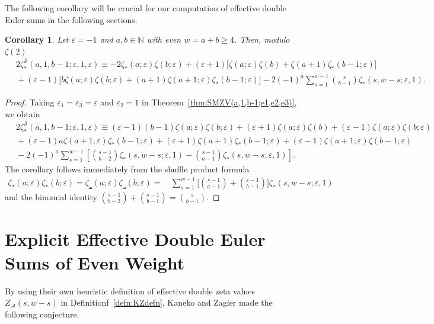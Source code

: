 \documentclass{article}
\newcommand{\sha}{\shuffle}
\newcommand{\Sy}{{\mathcal S}}
\newcommand\eps{{\varepsilon}}
\newcommand{\calA}{\mathcal{A}}
\newcommand{\N}{\mathbb{N}}
\theoremstyle{plain}
\newtheorem{cor}[thm]{Corollary}
\theoremstyle{definition}
\begin{document}
The following corollary will be crucial for our computation of effective double Euler sums in the following sections.
\begin{cor}\label{cor:SMZV(a,1,b-1;eps,1,eps)}
Let $\eps=-1$ and $a,b\in\N$ with even $w=a+b\ge 4$. Then, modulo $\zeta(2)$
\begin{align*}
&\, 2\zeta_\ast^\Sy(a,1,b-1; \eps,1,\eps)
\equiv-2\zeta_*(a;\eps)\zeta(b;\eps)
+(\eps+1)\Big[\zeta(a;\eps)\zeta(b)
+\zeta(a+1)\zeta_*(b-1;\eps) \Big]\\
&\,+(\eps-1)\Big[
b\zeta(a;\eps)\zeta(b; \eps) +(a+1)\zeta(a+1; \eps)\zeta_*(b-1;\eps) \Big]
 -2(-1)^{a}\sum_{s=1}^{w-1}\binom{s}{b-1}\zeta_*(s,w-s;\eps,1) .
\end{align*}
\end{cor}

\begin{proof}
Taking $\eps_1=\eps_3=\eps$ and $\eps_2=1$ in Theorem~\ref{thm:SMZV(a,1,b-1;e1,e2,e3)}, we obtain
\begin{align*}
&\, 2\zeta_\ast^\Sy(a,1,b-1;\eps,1,\eps)
\equiv(\eps-1) (b-1)\zeta(a;\eps)\zeta(b; \eps)
+(\eps+1)\zeta(a;\eps)\zeta(b)
+(\eps-1)\zeta(a;\eps)\zeta(b;\eps)\\
&\,+(\eps-1)a\zeta(a+1; \eps)\zeta_*(b-1;\eps)
+(\eps+1)\zeta(a+1)\zeta_*(b-1;\eps)
+(\eps-1)\zeta(a+1;\eps)\zeta(b-1;\eps) \\
&\, -2(-1)^{a}\sum_{s=1}^{w-1}\left[ \binom{s-1}{b-2} \zeta_*(s,w-s;\eps,1) -\binom{s-1}{a-1}\zeta_*(s,w-s;\eps,1)\right].
\end{align*}
The corollary follows immediately from  the shuffle product formula
\begin{align*}
\zeta_*(a;\eps)\zeta_*(b;\eps)=\zeta_\sha(a;\eps)\zeta_\sha(b;\eps)= &\, \sum_{s=1}^{w-1} \bigg[\binom{s-1}{a-1}+\binom{s-1}{b-1}\bigg] \zeta_*(s,w-s;\eps,1)
\end{align*}
and the binomial identity $\binom{s-1}{b-2}+\binom{s-1}{b-1}=\binom{s}{b-1}$.
\end{proof}


\section{Explicit Effective Double Euler Sums of Even Weight}\label{sec:depthTwoEvenWt}
By using their own heuristic definition of effective double zeta values $Z_\calA(s,w-s)$ in Definitionf~\ref{defn:KZdefn}, Kaneko and Zagier made the following conjecture.
\end{document}
